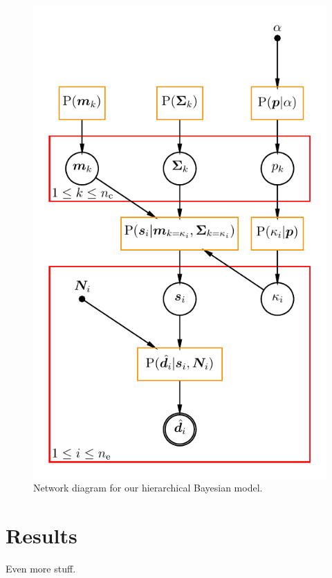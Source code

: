 \documentclass[a4paper,fleqn,usenatbib]{mnras}
\begin{document}
\begin{figure}
	\includegraphics[width=\columnwidth]{bhm_plot.pdf}
    \caption{Network diagram for our hierarchical Bayesian model.}
    \label{fig:network_diagram}
\end{figure}


\section{Results}

Even more stuff.
\end{document}
